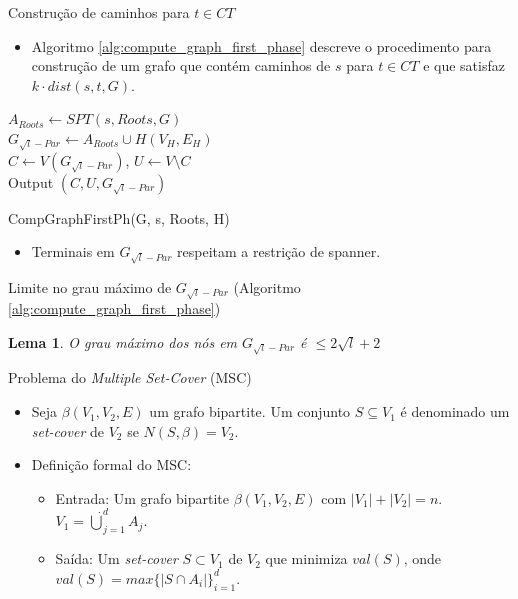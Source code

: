 \documentclass[10pt]{beamer}
\newtheorem{lema}{Lema}
\begin{document}
\begin{frame}{Construção de caminhos para $t \in CT$}
  \begin{itemize}
    \item Algoritmo \ref{alg:compute_graph_first_phase} descreve o procedimento para construção de um grafo que contém caminhos de $s$ para $t \in CT$ e que satisfaz $k \cdot dist(s,t,G)$.
  \end{itemize}

\begin{algorithm}[H]
$A_{Roots} \gets SPT(s,Roots,G)$\\
$G_{\sqrt{l}-Par} \gets A_{Roots} \cup H(V_H, E_H)$\\
$C \gets V(G_{\sqrt{l}-Par})$, $U \gets V \setminus C$\\
Output $(C,U,G_{\sqrt{l}-Par})$
\caption{CompGraphFirstPh(G, s, Roots, H)} 
\label{alg:compute_graph_first_phase}
\end{algorithm}

\begin{itemize}
  \item Terminais em $G_{\sqrt{l}-Par}$ respeitam a restrição de spanner.
\end{itemize}

\end{frame}

\begin{frame}{Limite no grau máximo de $G_{\sqrt{l}-Par}$ (Algoritmo \ref{alg:compute_graph_first_phase})}
  \begin{lema}
    \label{lem:roots_size}
    O grau máximo dos nós em $G_{\sqrt{l}-Par}$ é $\leq 2\sqrt{l} + 2$
  \end{lema}
\hypertarget{roots_size}{}
\hyperlink{roots_size_slide}{}
\end{frame}

\begin{frame}{Problema do \emph{Multiple Set-Cover} (MSC)}
  \begin{itemize}
    \item Seja $\beta(V_1,V_2,E)$ um grafo bipartite. Um conjunto $S \subseteq V_1$ é denominado um \emph{set-cover} de $V_2$ se $N(S,\beta) = V_2$.
    \item Definição formal do MSC:
    \begin{itemize}
      \item Entrada: Um grafo bipartite $\beta(V_1,V_2,E)$ com $|V_1| + |V_2| = n$. $V_1 = \dot \bigcup_{j=1}^{d}A_j$.
      \item Saída: Um \emph{set-cover} $S \subset V_1$ de $V_2$ que minimiza $val(S)$, onde $val(S) = max\lbrace |S \cap A_i| \rbrace_{i=1}^{d}$.
    \end{itemize}
  \end{itemize}
\end{frame}
\end{document}
